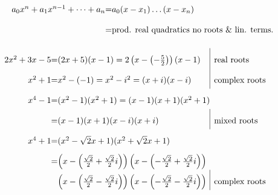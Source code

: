 \begin{frame}
$\begin{array}{r@{}c@{}l}
a_0 x^{n}+a_1x^{n-1}+\dots + a_n&=& a_0 (x-x_1)\dots (x-x_n)\\
&=&\text{prod. real quadratics no roots \& lin. terms.}
\end{array}
$

\begin{example}

$
\renewcommand{\arraystretch}{2}
\begin{array}{@{\!\!}r@{}c@{}l@{}l@{}|l}
2x^2+3x-5&=&(2x+5)(x-1)= 2\left(x-\left(-\frac{5 }{2}\right)\right)(x-1)&&\text{real roots} \\
x^2+1&=&x^2-(-1)=x^2-i^2=(x+i)(x-i)&&\text{complex roots}\\
x^4-1&=&(x^2-1)(x^2+1)=(x-1)(x+1)(x^2+1)\\
&=& (x-1)(x+1)(x-i)(x+i) &&\text{mixed roots}\\
x^4+1&=&(x^2-\sqrt{2}x+1)(x^2+\sqrt{2}x+1)\\
&=&
\left(x-\left(\frac{\sqrt{2}}{2}+\frac{\sqrt{2}}{2}i\right)\right)
\left(x-\left(-\frac{\sqrt{2}}{2}+\frac{\sqrt{2}}{2}i\right)\right)\\&&
\left(x-\left(\frac{\sqrt{2}}{2}-\frac{\sqrt{2}}{2}i\right)\right)
\left(x-\left(-\frac{\sqrt{2}}{2}-\frac{\sqrt{2}}{2}i\right)\right)&& \text{complex roots}
\end{array}$
\end{example}

 \end{frame}